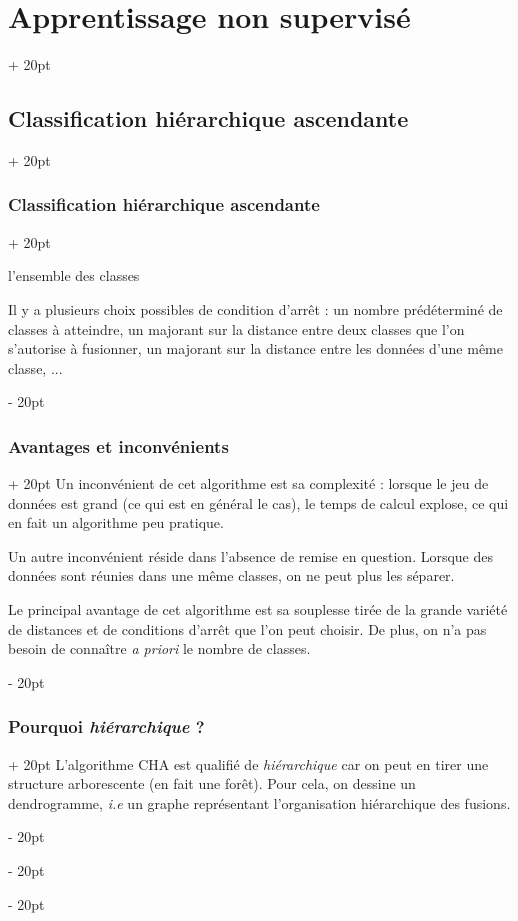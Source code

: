 \documentclass[a4paper, 12pt, twoside]{article}
\newenvironment{indalgo}[2][H]{
    \begin{algoBox}
        \begin{algorithm}[#1]
            \caption{#2}
}
{
        \end{algorithm}
    \end{algoBox}
}
\newcommand{\ind}[1][20pt]{\advance\leftskip + #1}
\newcommand{\deind}[1][20pt]{\advance\leftskip - #1}
\newenvironment{indt}[2][20pt]{#2 \par \ind[#1]}{\par \deind} %
\begin{document}
\begin{indt}{\section{Apprentissage non supervisé}}
\begin{indt}{\subsection{Classification hiérarchique ascendante}}
\begin{indt}{\subsubsection{Classification hiérarchique ascendante}}
\begin{indalgo}{Classification hiérarchique ascendante}

                    \Return l'ensemble des classes\;
                \end{indalgo}

                Il y a plusieurs choix possibles de condition d'arrêt :
                un nombre prédéterminé de classes à atteindre, un majorant sur la distance entre deux classes que l'on s'autorise à fusionner, un majorant sur la distance entre les données d'une même classe, ...
            \end{indt}

            \vspace{12pt}
            
            \begin{indt}{\subsubsection{Avantages et inconvénients}}
                Un inconvénient de cet algorithme est sa complexité : lorsque le jeu de données est grand (ce qui est en général le cas), le temps de calcul explose, ce qui en fait un algorithme peu pratique.

                Un autre inconvénient réside dans l'absence de remise en question. Lorsque des données sont réunies dans une même classes, on ne peut plus les séparer.

                Le principal avantage de cet algorithme est sa souplesse tirée de la grande variété de distances et de conditions d'arrêt que l'on peut choisir. De plus, on n'a pas besoin de connaître \textit{a priori} le nombre de classes.
            \end{indt}

            \vspace{12pt}
            
            \begin{indt}{\subsubsection{Pourquoi \emph{hiérarchique} ?}}
                L'algorithme CHA est qualifié de \emph{hiérarchique} car on peut en tirer une structure arborescente (en fait une forêt). Pour cela, on dessine un dendrogramme, \textit{i.e} un graphe représentant l'organisation hiérarchique des fusions.


\end{indt}
\end{indt}
\end{indt}
\end{document}
